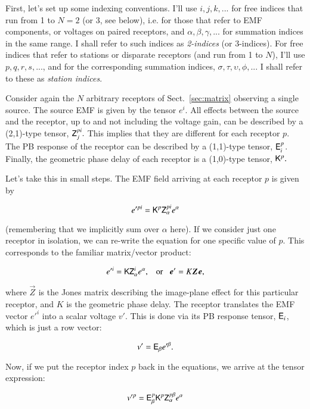 \documentclass[]{aa}
\newcommand{\jones}[2]{\vec {#1}_{#2}}
\begin{document}
First, let's set up some indexing conventions. I'll use $i,j,k,...$ for free indices that run from 1 to $N=2$ (or 3, see below), i.e. for those that refer to EMF components, or voltages on paired receptors, and $\alpha,\beta,\gamma,...$ for summation indices in the same range. I shall refer to such indices as \emph{2-indices} (or 3-indices). For free indices that refer to stations or disparate receptors (and run from 1 to $N$), I'll use $p,q,r,s,...$, and for the corresponding summation indices, $\sigma,\tau,\upsilon,\phi,...$ I shall refer to these as \emph{station indices}.

Consider again the $N$ arbitrary receptors of Sect.~\ref{sec:matrix} observing a single source. The source EMF is given by the tensor $e^i.$ 
All effects between the source and the receptor, up to and not including the voltage gain, can be described by a (2,1)-type tensor, $\mathsf{Z}_{j}^{pi}.$ This implies that they are different for each receptor $p$. The PB response of the  receptor can be described by a (1,1)-type tensor, $\mathsf{E}_i^p$.
Finally, the geometric phase delay of each receptor is a (1,0)-type tensor, $\mathsf{K}^{p}.$

Let's take this in small steps. The EMF field arriving at each receptor $p$ is given by

\begin{equation}
\label{eq:gme-deriv-KZe}
e'^{pi}=\mathsf{K}^{p}\mathsf{Z}_{\alpha}^{pi}e^{\alpha}
\end{equation}

(remembering that we implicitly sum over $\alpha$ here). If we consider just one receptor in isolation, we can re-write the equation for one specific value of $p$. This corresponds to  the familiar matrix/vector product:

\[
e'^i = \tens{K}\tens{Z}_{\alpha}^{i}e^{\alpha},\;\;\;\mbox{or}\;\;\;\vec e' = K \jones{Z}{} \vec e,
\]

where $\jones{Z}{}$ is the Jones matrix describing the image-plane effect for this particular receptor, 
and $K$ is the geometric phase delay. The receptor translates the EMF vector $e'^{i}$ into a scalar voltage $v'$.  
This is done via its PB response tensor, $\mathsf{E}_i$, which is just a row vector:

\[
v'=\mathsf{E}_{\beta}e'^{\beta}.
\]


Now, if we put the receptor index $p$ back in the equations, we arrive at the tensor expression:

\begin{equation}
\label{eq:gme-deriv-EKZe}
v'^{p}=\mathsf{E}_{\beta}^{p}\mathsf{K}^{p}\mathsf{Z}_{\alpha}^{p\beta}e^{\alpha}
\end{equation}
\end{document}
